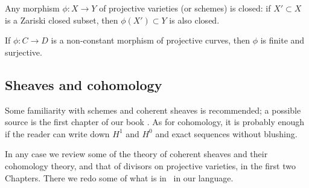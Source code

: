 \begin{theorem}
 Any morphism $\phi: X\to Y$ of projective varieties (or schemes) is closed: if $X'\subset X$ is a Zariski closed subset,
 then $\phi(X') \subset Y$ is also closed.
\end{theorem}

\begin{corollary}
If $\phi: C\to D$ is a non-constant morphism of projective curves, then $\phi$ is finite and surjective.
\end{corollary}

\subsection {Sheaves and cohomology} 

Some familiarity with schemes and coherent sheaves is recommended; a possible source is
the first chapter of our book \cite{GeomSchemes}.
As for cohomology, it is probably enough if the reader can write down $H^1$ and $H^0$ and exact sequences without blushing.

In any case we review some of the theory of coherent sheaves and their cohomology theory, and that of divisors on projective 
varieties, in the first two Chapters. There we redo some of what is in~\cite[Chapter IV]{Hartshorne1977}  in our language. 





%
%
%




